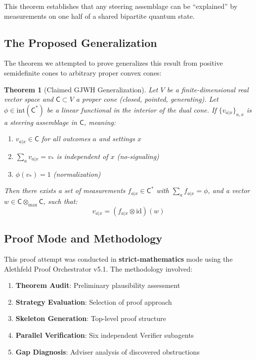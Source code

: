 \documentclass[11pt,a4paper]{article}
\newtheorem{theorem}{Theorem}[section]
\theoremstyle{definition}
\newcommand{\C}{\mathsf{C}}
\newcommand{\Cstar}{\mathsf{C}^*}
\newcommand{\tmax}{\otimes_{\max}}
\newcommand{\id}{\mathrm{id}}
\newcommand{\interior}{\mathrm{int}}
\begin{document}
This theorem establishes that any steering assemblage can be ``explained'' by measurements on one half of a shared bipartite quantum state.

\subsection{The Proposed Generalization}

The theorem we attempted to prove generalizes this result from positive semidefinite cones to arbitrary proper convex cones:

\begin{theorem}[Claimed GJWH Generalization]\label{thm:main}
Let $V$ be a finite-dimensional real vector space and $\C \subset V$ a proper cone (closed, pointed, generating). Let $\phi \in \interior(\Cstar)$ be a linear functional in the interior of the dual cone. If $\{v_{a|x}\}_{a,x}$ is a steering assemblage in $\C$, meaning:
\begin{enumerate}[label=(\roman*)]
    \item $v_{a|x} \in \C$ for all outcomes $a$ and settings $x$
    \item $\sum_a v_{a|x} = v_*$ is independent of $x$ (no-signaling)
    \item $\phi(v_*) = 1$ (normalization)
\end{enumerate}
Then there exists a set of measurements $f_{a|x} \in \Cstar$ with $\sum_a f_{a|x} = \phi$, and a vector $w \in \C \tmax \C$, such that:
\[
v_{a|x} = (f_{a|x} \otimes \id)(w)
\]
\end{theorem}

\subsection{Proof Mode and Methodology}

This proof attempt was conducted in \textbf{strict-mathematics} mode using the Alethfeld Proof Orchestrator v5.1. The methodology involved:

\begin{enumerate}
    \item \textbf{Theorem Audit}: Preliminary plausibility assessment
    \item \textbf{Strategy Evaluation}: Selection of proof approach
    \item \textbf{Skeleton Generation}: Top-level proof structure
    \item \textbf{Parallel Verification}: Six independent Verifier subagents
    \item \textbf{Gap Diagnosis}: Adviser analysis of discovered obstructions
\end{enumerate}
\end{document}
